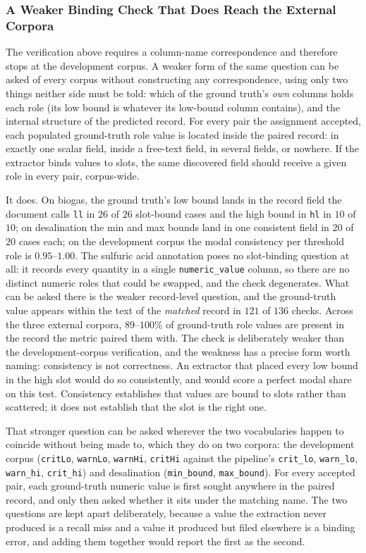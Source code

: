 \documentclass[11pt]{article}
\begin{document}
\subsubsection{A Weaker Binding Check That Does Reach the External Corpora}
\label{sec:binding_check}
The verification above requires a column-name correspondence and therefore stops
at the development corpus. A weaker form of the same question can be asked of
every corpus without constructing any correspondence, using only two things
neither side must be told: which of the ground truth's \emph{own} columns holds
each role (its low bound is whatever its low-bound column contains), and the
internal structure of the predicted record. For every pair the assignment
accepted, each populated ground-truth role value is located inside the paired
record: in exactly one scalar field, inside a free-text field, in several
fields, or nowhere. If the extractor binds values to slots, the same discovered
field should receive a given role in every pair, corpus-wide.

It does. On biogas, the ground truth's low bound lands in the record field the
document calls \texttt{ll} in $26$ of $26$ slot-bound cases and the high bound
in \texttt{hl} in $10$ of $10$; on desalination the min and max bounds land in
one consistent field in $20$ of $20$ cases each; on the development corpus the
modal consistency per threshold role is $0.95$--$1.00$. The sulfuric acid
annotation poses no slot-binding question at all: it records every quantity in a
single \texttt{numeric\_value} column, so there are no distinct numeric roles
that could be swapped, and the check degenerates. What can be asked there is the
weaker record-level question, and the ground-truth value appears within the text
of the \emph{matched} record in $121$ of $136$ checks. Across the three external
corpora, $89$--$100\%$ of ground-truth role values are present in the record the
metric paired them with.
The check is deliberately weaker than the development-corpus verification, and
the weakness has a precise form worth naming: consistency is not correctness. An
extractor that placed every low bound in the high slot would do so consistently,
and would score a perfect modal share on this test. Consistency establishes that
values are bound to slots rather than scattered; it does not establish that the
slot is the right one.

That stronger question can be asked wherever the two vocabularies happen to
coincide without being made to, which they do on two corpora: the development
corpus (\texttt{critLo}, \texttt{warnLo}, \texttt{warnHi}, \texttt{critHi} against
the pipeline's \texttt{crit\_lo}, \texttt{warn\_lo}, \texttt{warn\_hi},
\texttt{crit\_hi}) and desalination (\texttt{min\_bound}, \texttt{max\_bound}).
For every accepted pair, each ground-truth numeric value is first sought
anywhere in the paired record, and only then asked whether it sits under the
matching name. The two questions are kept apart deliberately, because a value
the extraction never produced is a recall miss and a value it produced but filed
elsewhere is a binding error, and adding them together would report the first as
the second.
\end{document}
